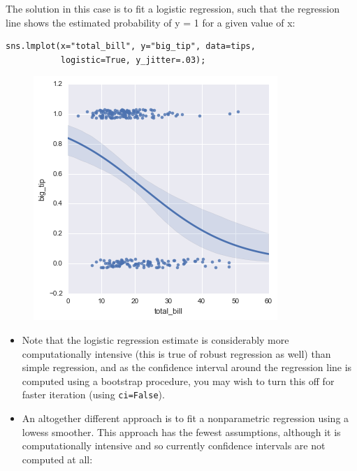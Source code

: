 \documentclass{beamer}
\begin{document}
\begin{frame}[fragile]
The solution in this case is to fit a logistic regression, such that the regression line shows the estimated probability of y = 1 for a given value of x:
\begin{verbatim}
sns.lmplot(x="total_bill", y="big_tip", data=tips,
           logistic=True, y_jitter=.03);
          \end{verbatim}
\begin{figure}
	\centering
	\includegraphics[width=0.7\linewidth]{images/regression_31_0}
\end{figure}
\end{frame}
\begin{frame}
\large
\begin{itemize}
\item Note that the logistic regression estimate is considerably more computationally intensive (this is true of robust regression as well) than simple regression, and as the confidence interval around the regression line is computed using a bootstrap procedure, you may wish to turn this off for faster iteration (using \texttt{ci=False}).
\item An altogether different approach is to fit a nonparametric regression using a lowess smoother. This approach has the fewest assumptions, although it is computationally intensive and so currently confidence intervals are not computed at all:
\end{itemize}


\end{frame}
\end{document}

